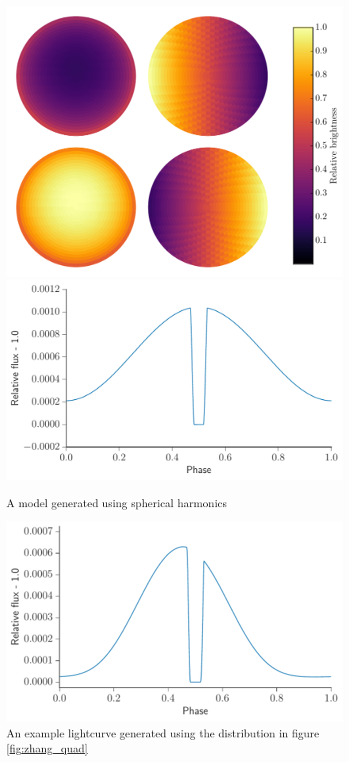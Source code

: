 \documentclass[a4paper,fleqn,usenatbib]{mnras}
\begin{document}
\begin{figure}
\begin{center}
\includegraphics[width=\columnwidth]{img/sphere_quad.pdf}
\includegraphics[width=\columnwidth]{img/spherical_lc.pdf}
\caption{A model generated using spherical harmonics}
\label{fig:harmonics}
\end{center}
\end{figure}

\begin{figure}
\begin{center}
\includegraphics[width=\columnwidth]{img/zhang_lc.pdf}
\caption{An example lightcurve generated using the distribution in figure \ref{fig:zhang_quad}}
\label{fig:zhang_lc}
\end{center}
\end{figure}
\end{document}
